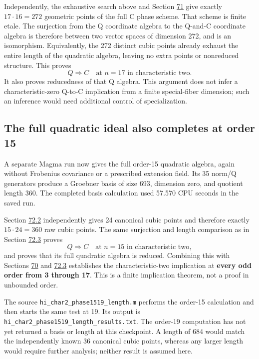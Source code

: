 \documentclass[11pt,reqno]{amsart}
\theoremstyle{plain}
\begin{document}
Independently, the exhaustive search above and Section \hyperref[sec:71]{71} give
exactly \(17\cdot16=272\) geometric points of the full C phase
scheme. That scheme is finite etale. The surjection from the Q
coordinate algebra to the Q-and-C coordinate algebra is therefore
between two vector spaces of dimension 272, and is an isomorphism.
Equivalently, the 272 distinct cubic points already exhaust the
entire length of the quadratic algebra, leaving no extra points
or nonreduced structure.
This proves
\begin{equation*}
 \boxed{Q\Longrightarrow C\quad\text{at }n=17
        \text{ in characteristic two}.} \tag{72.2}
\end{equation*}
It also proves reducedness of that Q algebra. This argument does
not infer a characteristic-zero Q-to-C implication from a finite
special-fiber dimension; such an inference would need additional
control of specialization.

\subsection{The full quadratic ideal also completes at order 15}\label{sec:72.4}

A separate Magma run now gives the full order-15 quadratic algebra,
again without Frobenius covariance or a prescribed extension field.
Its 35 norm/Q generators produce a Groebner basis of size 693,
dimension zero, and quotient length 360. The completed basis
calculation used 57.570 CPU seconds in the saved run.

Section \hyperref[sec:72.2]{72.2} independently gives 24 canonical cubic points and
therefore exactly \(15\cdot24=360\) raw cubic points. The same
surjection and length comparison as in Section \hyperref[sec:72.3]{72.3} proves
\[
 \boxed{Q\Longrightarrow C\quad\text{at }n=15
        \text{ in characteristic two},}
\]
and proves that its full quadratic algebra is reduced. Combining
this with Sections \hyperref[sec:70]{70} and \hyperref[sec:72.3]{72.3} establishes the characteristic-two
implication at \textbf{every odd order from 3 through 17}. This is a
finite implication theorem, not a proof in unbounded order.

The source \texttt{hi\_\allowbreak char2\_\allowbreak phase1519\_\allowbreak length.m} performs the order-15
calculation and then starts the same test at 19. Its output is
\texttt{hi\_\allowbreak char2\_\allowbreak phase1519\_\allowbreak length\_\allowbreak results.txt}. The order-19 computation
has not yet returned a basis or length at this checkpoint. A length
of 684 would match the independently known 36 canonical cubic
points, whereas any larger length would require further analysis;
neither result is assumed here.
\end{document}
